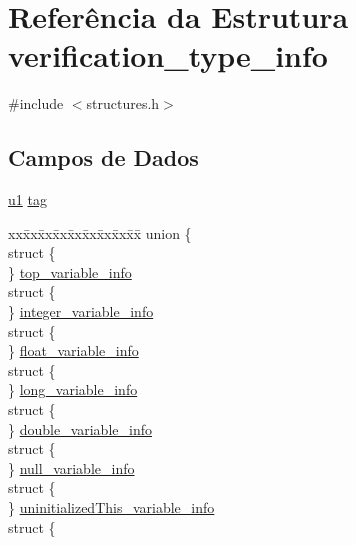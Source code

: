 \hypertarget{structverification__type__info}{}\section{Referência da Estrutura verification\+\_\+type\+\_\+info}
\label{structverification__type__info}


{\ttfamily \#include $<$structures.\+h$>$}

\subsection*{Campos de Dados}
\begin{DoxyCompactItemize}
\item 
\hyperlink{lista__operandos_8h_ad9f4cdb6757615aae2fad89dab3c5470}{u1} \hyperlink{structverification__type__info_aeb9c72b398b4d3ce0863a916f973b05c}{tag}
\item 
\begin{tabbing}
xx\=xx\=xx\=xx\=xx\=xx\=xx\=xx\=xx\=\kill
union \{\\
\>struct \{\\
\>\} \hyperlink{structverification__type__info_ab881a8ef77dc9d79b2f1271807d9c38a}{top\_variable\_info}\\
\>struct \{\\
\>\} \hyperlink{structverification__type__info_a622b07bc67a176d7a3d4513dc3687d0a}{integer\_variable\_info}\\
\>struct \{\\
\>\} \hyperlink{structverification__type__info_afcf9cc760065729b332f191fbd3e9adf}{float\_variable\_info}\\
\>struct \{\\
\>\} \hyperlink{structverification__type__info_a6dddbb4250cda83faf00d2dbe869c4b6}{long\_variable\_info}\\
\>struct \{\\
\>\} \hyperlink{structverification__type__info_ae2e04072010fa85856e99f2e5b723c1e}{double\_variable\_info}\\
\>struct \{\\
\>\} \hyperlink{structverification__type__info_a8e9d762a5d2903b8c3e4d201b3e93a39}{null\_variable\_info}\\
\>struct \{\\
\>\} \hyperlink{structverification__type__info_a9b1dd36fc75aad3dc228875395a1c4ef}{uninitializedThis\_variable\_info}\\
\>struct \{\\

\end{tabbing}
\end{DoxyCompactItemize}
